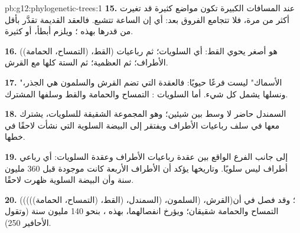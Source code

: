 \begin{solution}{pb:g12:phylogenetic-trees:1}
\textbf{15.} عند المسافات الكبيرة تكون مواضع كثيرة قد تغيرت أكثر من
مرة، فلا تتجامع الفروق بعد: أي إن الساعة تتشبع. فالعقد القديمة تقدَّر
بأقل من قدرها بهذه ؛ ويلزم  أبطأ، أو  كثيرة.

\textbf{16.} (القط، (التمساح، الحمامة)) هو أصغر  يحوي القط:
أي السلويات؛ ثم رباعيات الأطراف؛ ثم  العظمية؛ ثم الستة كلها
مع القرش.

\textbf{17.} "الأسماك" ليست فرعًا حيويًا: فالعقدة التي تضم القرش
والسلمون هي الجذر، ونسلها يشمل كل شيء. أما السلويات :
التمساح والحمامة والقط وسلفها المشترك.

\textbf{18.} السمندل  حاضر لا وسط بين شيئين؛ وهو المجموعة الشقيقة
للسلويات، يشترك معها في سلف رباعيات الأطراف ويفتقر إلى البيضة السلوية
التي نشأت لاحقًا في خطها.

\textbf{19.} إلى جانب الفرع الواقع بين عقدة رباعيات الأطراف وعقدة
السلويات: أي رباعي أطراف ليس سلويًا. وتاريخها يؤكد أن الأطراف الأربعة
كانت موجودة قبل 360 مليون سنة وأن البيضة السلوية ظهرت لاحقًا.

\textbf{20.} (القرش، (السلمون، (السمندل، (القط، (التمساح،
الحمامة)))))؛ وقد فصل  في أن التمساح والحمامة شقيقان؛ ويؤرخ
انفصالهما، بهذه ، بنحو 140 مليون سنة (وتقول الأحافير 250).
\end{solution}
